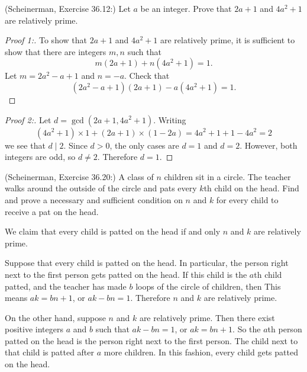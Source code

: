 \documentclass{article}
\theoremstyle{definition}
\begin{document}
\begin{question}
    (Scheinerman, Exercise 36.12:) 
    Let $a$ be an integer.  Prove that $2a+1$ and $4a^2+1$ are relatively prime.
\end{question}
\begin{solution}
\begin{proof}[Proof 1:]
To show that $2a+1$ and $4a^2 + 1$ are relatively prime, it is sufficient to show that there are integers $m, n$ such that
\[ m(2a+1) + n(4a^2+1) = 1. \]
Let $m = 2a^2 - a +1$ and $n = -a$.  Check that
\[  (2a^2 - a +1)(2a+1) -a(4a^2+1) = 1.  \]
\end{proof}

\begin{proof}[Proof 2:]
    Let $d = \gcd(2a+1,4a^2+1)$.
    Writing
    \[
        (4a^2+1)\times 1 + (2a+1)\times (1-2a) = 4a^2 + 1 + 1 - 4a^2 = 2
    \]
    we see that $d \mid 2$.  Since $d>0$, the only cases are $d=1$ and $d=2$.
    However, both integers are odd, so $d \neq 2$.  Therefore $d=1$.
\end{proof}
\end{solution}


\begin{question}
    (Scheinerman, Exercise 36.20:)
    A class of $n$ children sit in a circle.
    The teacher walks around the outside of the circle and pats every
    $k$th child on the head.
    Find and prove a necessary and sufficient condition on $n$ and $k$
    for every child to receive a pat on the head.
\end{question}
\begin{solution}
    We claim that every child is patted on the head if and only $n$ and
    $k$ are relatively prime.

    Suppose that every child is patted on the head.  In particular,
    the person right next to the first person gets patted on the head.
    If this child is the $a$th child patted, and the teacher has
    made $b$ loops of the circle of children, then
    This means $ak = bn + 1$, or $ak-bn=1$.  Therefore $n$ and $k$
    are relatively prime.

    On the other hand, suppose $n$ and $k$ are relatively prime.
    Then there exist positive integers $a$ and $b$ such that $ak - bn = 1$,
    or $ak = bn+1$.  So the $a$th person patted on the head is the person
    right next to the first person.  The child next to that child is
    patted after $a$ more children.  In this fashion, every child
    gets patted on the head. 
\end{solution}
\end{document}

